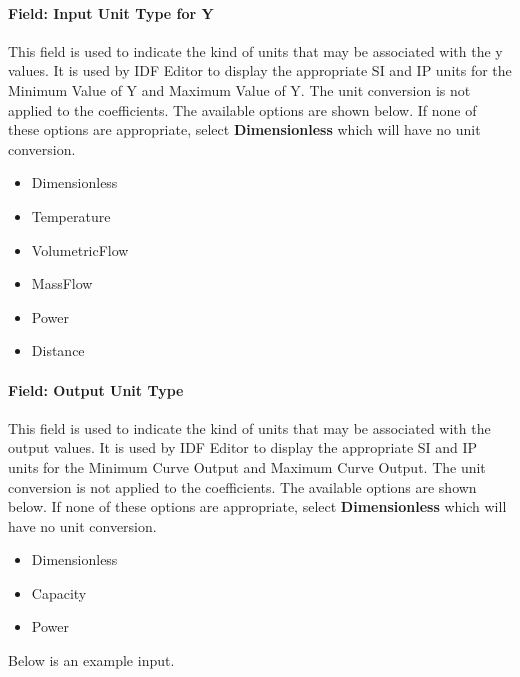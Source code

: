 \paragraph{Field: Input Unit Type for Y}\label{field-input-unit-type-for-y-1}

This field is used to indicate the kind of units that may be associated with the y values. It is used by IDF Editor to display the appropriate SI and IP units for the Minimum Value of Y and Maximum Value of Y. The unit conversion is not applied to the coefficients. The available options are shown below. If none of these options are appropriate, select \textbf{Dimensionless} which will have no unit conversion.

\begin{itemize}
\item
  Dimensionless
\item
  Temperature
\item
  VolumetricFlow
\item
  MassFlow
\item
  Power
\item
  Distance
\end{itemize}

\paragraph{Field: Output Unit Type}\label{field-output-unit-type-5}

This field is used to indicate the kind of units that may be associated with the output values. It is used by IDF Editor to display the appropriate SI and IP units for the Minimum Curve Output and Maximum Curve Output. The unit conversion is not applied to the coefficients. The available options are shown below. If none of these options are appropriate, select \textbf{Dimensionless} which will have no unit conversion.

\begin{itemize}
\item
  Dimensionless
\item
  Capacity
\item
  Power
\end{itemize}

Below is an example input.

